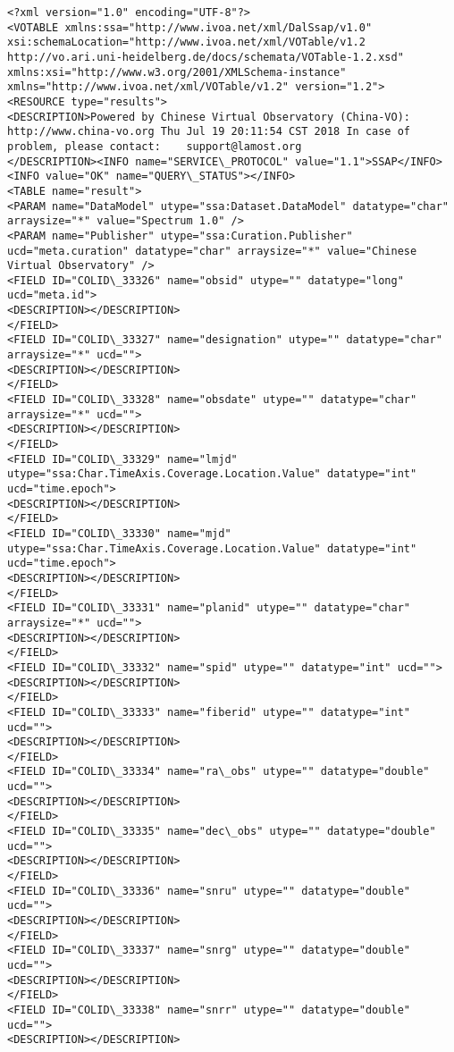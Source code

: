 \documentclass[11pt]{article}
\begin{document}
    \begin{Verbatim}[commandchars=\\\{\}]
<?xml version="1.0" encoding="UTF-8"?>
<VOTABLE xmlns:ssa="http://www.ivoa.net/xml/DalSsap/v1.0" xsi:schemaLocation="http://www.ivoa.net/xml/VOTable/v1.2 http://vo.ari.uni-heidelberg.de/docs/schemata/VOTable-1.2.xsd" xmlns:xsi="http://www.w3.org/2001/XMLSchema-instance" xmlns="http://www.ivoa.net/xml/VOTable/v1.2" version="1.2">
<RESOURCE type="results">
<DESCRIPTION>Powered by Chinese Virtual Observatory (China-VO): http://www.china-vo.org Thu Jul 19 20:11:54 CST 2018 In case of problem, please contact:	support@lamost.org
</DESCRIPTION><INFO name="SERVICE\_PROTOCOL" value="1.1">SSAP</INFO>
<INFO value="OK" name="QUERY\_STATUS"></INFO>
<TABLE name="result">
<PARAM name="DataModel" utype="ssa:Dataset.DataModel" datatype="char" arraysize="*" value="Spectrum 1.0" />
<PARAM name="Publisher" utype="ssa:Curation.Publisher" ucd="meta.curation" datatype="char" arraysize="*" value="Chinese Virtual Observatory" />
<FIELD ID="COLID\_33326" name="obsid" utype="" datatype="long" ucd="meta.id">
<DESCRIPTION></DESCRIPTION>
</FIELD>
<FIELD ID="COLID\_33327" name="designation" utype="" datatype="char" arraysize="*" ucd="">
<DESCRIPTION></DESCRIPTION>
</FIELD>
<FIELD ID="COLID\_33328" name="obsdate" utype="" datatype="char" arraysize="*" ucd="">
<DESCRIPTION></DESCRIPTION>
</FIELD>
<FIELD ID="COLID\_33329" name="lmjd" utype="ssa:Char.TimeAxis.Coverage.Location.Value" datatype="int" ucd="time.epoch">
<DESCRIPTION></DESCRIPTION>
</FIELD>
<FIELD ID="COLID\_33330" name="mjd" utype="ssa:Char.TimeAxis.Coverage.Location.Value" datatype="int" ucd="time.epoch">
<DESCRIPTION></DESCRIPTION>
</FIELD>
<FIELD ID="COLID\_33331" name="planid" utype="" datatype="char" arraysize="*" ucd="">
<DESCRIPTION></DESCRIPTION>
</FIELD>
<FIELD ID="COLID\_33332" name="spid" utype="" datatype="int" ucd="">
<DESCRIPTION></DESCRIPTION>
</FIELD>
<FIELD ID="COLID\_33333" name="fiberid" utype="" datatype="int" ucd="">
<DESCRIPTION></DESCRIPTION>
</FIELD>
<FIELD ID="COLID\_33334" name="ra\_obs" utype="" datatype="double" ucd="">
<DESCRIPTION></DESCRIPTION>
</FIELD>
<FIELD ID="COLID\_33335" name="dec\_obs" utype="" datatype="double" ucd="">
<DESCRIPTION></DESCRIPTION>
</FIELD>
<FIELD ID="COLID\_33336" name="snru" utype="" datatype="double" ucd="">
<DESCRIPTION></DESCRIPTION>
</FIELD>
<FIELD ID="COLID\_33337" name="snrg" utype="" datatype="double" ucd="">
<DESCRIPTION></DESCRIPTION>
</FIELD>
<FIELD ID="COLID\_33338" name="snrr" utype="" datatype="double" ucd="">
<DESCRIPTION></DESCRIPTION>

\end{Verbatim}
\end{document}
